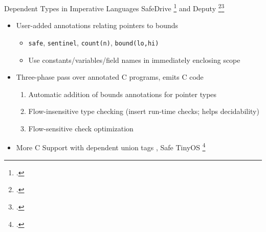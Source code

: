 \documentclass[aspectratio=169]{beamer}
\begin{document}
\begin{frame}{Dependent Types in Imperative Languages}
    SafeDrive \footcite{zhou_safedrive:_2006} and Deputy \footcite{condit_dependent_2007}\footcite{anderson_static_2007}
    \begin{itemize}[<+->]
        \item User-added annotations relating pointers to bounds
            \begin{itemize}
                \item \texttt{safe}, \texttt{sentinel}, \texttt{count(n)}, \texttt{bound(lo,hi)}
                \item Use constants/variables/field names in immediately enclosing scope 
            \end{itemize}
        \item Three-phase pass over annotated C programs, emits C code
            \begin{enumerate}
                \item Automatic addition of bounds annotations for pointer types 
                \item Flow-insensitive type checking (insert run-time checks; helps decidability) 
                \item Flow-sensitive check optimization
            \end{enumerate}
        \item More C Support with dependent union tags , Safe TinyOS \footcite{cooprider_efficient_2007} %
    \end{itemize}
    \vspace{0.2in}
\end{frame}
\end{document}
